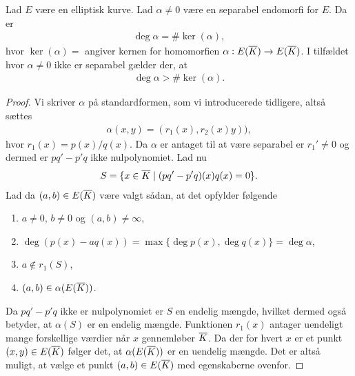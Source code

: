 \begin{proposition}
Lad $E$ være en elliptisk kurve. Lad $\alpha \neq 0$ være en separabel 
endomorfi for $E$. Da er 
\begin{align*}
	\deg \alpha = \# \ker (\alpha),
\end{align*}
hvor $\ker (\alpha) = $ angiver kernen for homomorfien 
$\alpha : E(\overline{K}) \to E(\overline{K})$. I tilfældet hvor $\alpha \neq 0$ ikke
er separabel gælder der, at 
\begin{align*}
	\deg \alpha > \# \ker (\alpha).
\end{align*}
\end{proposition}
\begin{proof}
Vi skriver $\alpha$ på standardformen, som vi introducerede tidligere, altså
sættes
\begin{align*}
	\alpha(x, y) = (r_1(x), r_2(x) y)),
\end{align*}
hvor $r_1(x) = p(x)/q(x)$. Da $\alpha$ er antaget til at være separabel er 
$r_1' \neq 0$ og dermed er $pq'-p'q$ ikke nulpolynomiet. Lad nu
\begin{align*}
	S = \{ x \in \overline{K} \mid (pq' - p'q)(x)q(x) = 0 \}.
\end{align*}
Lad da $(a, b) \in E(\overline{K})$ være valgt sådan, at det opfylder følgende
\begin{enumerate}
	\item $a \neq 0$, $b \neq 0$ og $(a, b) \neq \infty$,
	\item $\deg (p(x) - aq(x)) = \max \{ \deg p(x), \deg q(x) \} = \deg \alpha$,
	\item $a \notin r_1(S)$,
	\item $(a, b) \in \alpha(E(\overline{K}))$.
\end{enumerate}
Da $pq'-p'q$ ikke er 
nulpolynomiet er $S$ en endelig mængde, hvilket dermed også betyder, at 
$\alpha(S)$ er en endelig mængde. Funktionen $r_1(x)$ antager uendeligt 
mange forskellige værdier når $x$ gennemløber $\overline{K}$. 
Da der for hvert $x$ er et punkt $(x, y) \in E(\overline{K})$ følger det, at 
$\alpha(E(\overline{K}))$ er en uendelig mængde. Det er altså muligt, at vælge et
punkt $(a, b) \in E(\overline{K})$ med egenskaberne ovenfor.


\end{proof}

